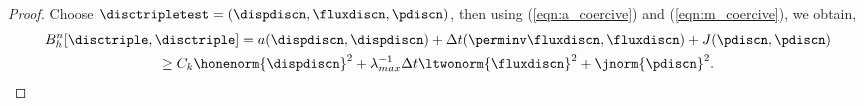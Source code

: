 \begin{proof}

\noindent {} \newline
Choose $\disctripletest = (\dispdiscn, \fluxdiscn,\pdiscn)$, then using (\ref{eqn:a_coercive}) and (\ref{eqn:m_coercive}), we obtain,
\begin{multline}
B_{h}^{n}[\disctriple,\disctriple]=a(\dispdiscn,\dispdiscn)+ {\Delta t}(\perminv \fluxdiscn,\fluxdiscn) +J(\pdiscn,\pdiscn) \\ \geq C_{k} \honenorm{\dispdiscn}^{2} + {\lambda_{max}^{-1}}{\Delta t}\ltwonorm{\fluxdiscn}^{2}  +\jnorm{\pdiscn}^{2}.
\label{ltwo_bound}
\end{multline}\newline



\end{proof}
